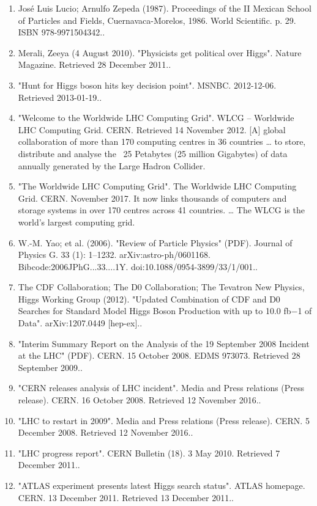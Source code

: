 \begin{enumerate}
    \item José Luis Lucio; Arnulfo Zepeda (1987). Proceedings of the II Mexican School of Particles and Fields, Cuernavaca-Morelos, 1986. World Scientific. p. 29. ISBN 978-9971504342..
    \item Merali, Zeeya (4 August 2010). "Physicists get political over Higgs". Nature Magazine. Retrieved 28 December 2011..
    \item "Hunt for Higgs boson hits key decision point". MSNBC. 2012-12-06. Retrieved 2013-01-19..
    \item "Welcome to the Worldwide LHC Computing Grid". WLCG – Worldwide LHC Computing Grid. CERN. Retrieved 14 November 2012. [A] global collaboration of more than 170 computing centres in 36 countries … to store, distribute and analyse the ~25 Petabytes (25 million Gigabytes) of data annually generated by the Large Hadron Collider.
    \item "The Worldwide LHC Computing Grid". The Worldwide LHC Computing Grid. CERN. November 2017. It now links thousands of computers and storage systems in over 170 centres across 41 countries. … The WLCG is the world's largest computing grid.
    \item W.-M. Yao; et al. (2006). "Review of Particle Physics" (PDF). Journal of Physics G. 33 (1): 1–1232. arXiv:astro-ph/0601168. Bibcode:2006JPhG...33....1Y. doi:10.1088/0954-3899/33/1/001..
    \item The CDF Collaboration; The D0 Collaboration; The Tevatron New Physics, Higgs Working Group (2012). "Updated Combination of CDF and D0 Searches for Standard Model Higgs Boson Production with up to 10.0 fb−1 of Data". arXiv:1207.0449 [hep-ex]..
    \item "Interim Summary Report on the Analysis of the 19 September 2008 Incident at the LHC" (PDF). CERN. 15 October 2008. EDMS 973073. Retrieved 28 September 2009..
    \item "CERN releases analysis of LHC incident". Media and Press relations (Press release). CERN. 16 October 2008. Retrieved 12 November 2016..
    \item "LHC to restart in 2009". Media and Press relations (Press release). CERN. 5 December 2008. Retrieved 12 November 2016..
    \item "LHC progress report". CERN Bulletin (18). 3 May 2010. Retrieved 7 December 2011..
    \item "ATLAS experiment presents latest Higgs search status". ATLAS homepage. CERN. 13 December 2011. Retrieved 13 December 2011..

\end{enumerate}

